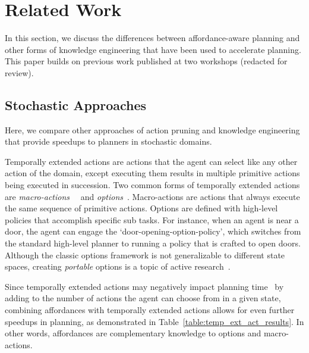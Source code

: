 \documentclass[letterpaper]{article}
\begin{document}
\section{Related Work}
\label{sec:related-work}

In this section, we discuss the differences between affordance-aware
planning and other forms of knowledge engineering that have been used
to accelerate planning.  This paper builds on previous work published
at two workshops (redacted for review).

\subsection{Stochastic Approaches}

Here, we compare other approaches of action pruning and
knowledge engineering that provide speedups to planners
in stochastic domains.


Temporally extended actions are actions that the agent can select like
any other action of the domain, except executing them results in
multiple primitive actions being executed in succession. Two common
forms of temporally extended actions are {\em
  macro-actions}~\cite{hauskrecht98} ~and {\em
  options}~\cite{sutton99}.  Macro-actions are actions that always
execute the same sequence of primitive actions. Options are defined
with high-level policies that accomplish specific sub tasks. For
instance, when an agent is near a door, the agent can engage the
`door-opening-option-policy', which switches from the standard
high-level planner to running a policy that is crafted to open
doors.  Although the classic options framework is not generalizable to
different state spaces, creating {\em portable} options is a topic of
active
research~\cite{konidaris07,konidaris2009efficient,Ravindran03analgebraic,croonenborghs2008learning,andre2002state,konidaris2012transfer}.

Since temporally extended actions may negatively impact planning
time~\cite{Jong:2008zr} by adding to the number of actions the agent
can choose from in a given state, combining affordances with
temporally extended actions allows for even further speedups in
planning, as demonstrated in Table~\ref{table:temp_ext_act_results}. In
other words, affordances are complementary knowledge to options and
macro-actions.

\end{document}
